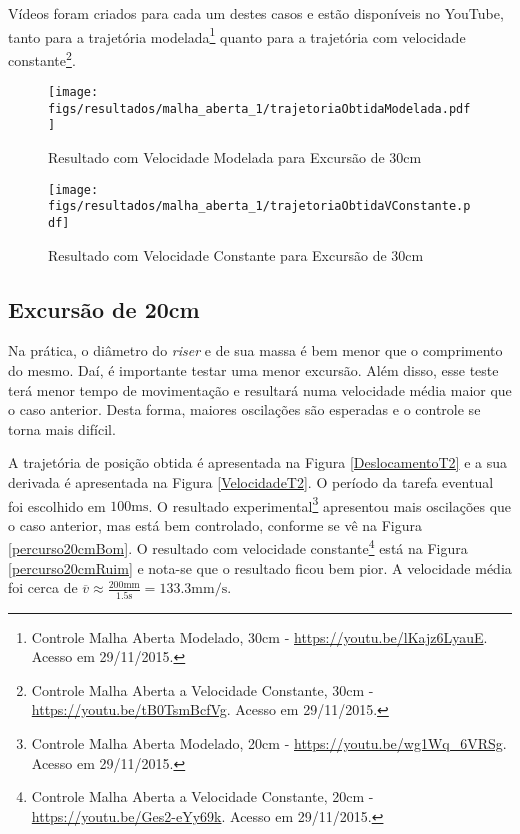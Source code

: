 Vídeos foram criados para cada um destes casos e estão disponíveis no YouTube{\sffamily\textregistered\textcopyright}, tanto para a trajetória modelada\footnote{Controle Malha Aberta Modelado, 30cm - \url{https://youtu.be/lKajz6LyauE}. Acesso em 29/11/2015.} quanto para a trajetória com velocidade constante\footnote{Controle Malha Aberta a Velocidade Constante, 30cm - \url{https://youtu.be/tB0TsmBcfVg}. Acesso em 29/11/2015.}.

\begin{figure}[!htb]
    \centering
    \begin{minipage}{.45\textwidth}
        \centering
        \texttt{[image: figs/resultados/malha\_aberta\_1/trajetoriaObtidaModelada.pdf]}
        \caption{Resultado com Velocidade Modelada para Excursão de 30cm}
        \label{trajetoriaObtidaModelada}
    \end{minipage}%
    \hspace{0.1cm}
    \begin{minipage}{0.45\textwidth}
        \centering
        \texttt{[image: figs/resultados/malha\_aberta\_1/trajetoriaObtidaVConstante.pdf]}
        \caption{Resultado com Velocidade Constante para Excursão de 30cm}
        \label{trajetoriaObtidaVConstante}
    \end{minipage}
\end{figure}

\subsection{Excursão de 20cm}
Na prática, o diâmetro do \textit{riser} e de sua massa é bem menor que o comprimento do mesmo. Daí, é importante testar uma menor excursão. Além disso, esse teste terá menor tempo de movimentação e resultará numa velocidade média maior que o caso anterior. Desta forma, maiores oscilações são esperadas e o controle se torna mais difícil.

A trajetória de posição obtida é apresentada na Figura \ref{DeslocamentoT2} e a sua derivada é apresentada na Figura \ref{VelocidadeT2}. O período da tarefa eventual foi escolhido em $100\mathrm{ms}$. O resultado experimental\footnote{Controle Malha Aberta Modelado, 20cm - \url{https://youtu.be/wg1Wq_6VRSg}. Acesso em 29/11/2015.} apresentou mais oscilações que o caso anterior, mas está bem controlado, conforme se vê na Figura \ref{percurso20cmBom}. O resultado com velocidade constante\footnote{Controle Malha Aberta a Velocidade Constante, 20cm - \url{https://youtu.be/Ges2-eYy69k}. Acesso em 29/11/2015.} está na Figura \ref{percurso20cmRuim} e nota-se que o resultado ficou bem pior. A velocidade média foi cerca de $\overline{v} \approx \frac{200\mathrm{mm}}{1.5\mathrm{s}} = 133.3\mathrm{mm}/\mathrm{s}$.


